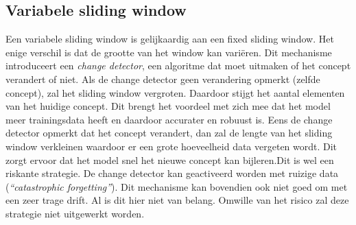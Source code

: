 \subsection{Variabele sliding window}
Een variabele sliding window is gelijkaardig aan een fixed sliding window. Het enige verschil is dat de grootte van het window kan variëren. Dit mechanisme introduceert een \textit{change detector}, een algoritme dat moet uitmaken of het concept verandert of niet. Als de change detector geen verandering opmerkt (zelfde concept), zal het sliding window vergroten. Daardoor stijgt het aantal elementen van het huidige concept. Dit brengt het voordeel met zich mee dat het model meer trainingsdata heeft en daardoor accurater en robuust is. Eens de change detector opmerkt dat het concept verandert, dan zal de lengte van het sliding window verkleinen waardoor er een grote hoeveelheid data vergeten wordt. Dit zorgt ervoor dat het model snel het nieuwe concept kan bijleren.Dit is wel een riskante strategie. De change detector kan geactiveerd worden met ruizige data (\textit{“catastrophic forgetting”}). Dit mechanisme kan bovendien ook niet goed om met een zeer trage drift. Al is dit hier niet van belang. Omwille van het risico zal deze strategie niet uitgewerkt worden.

